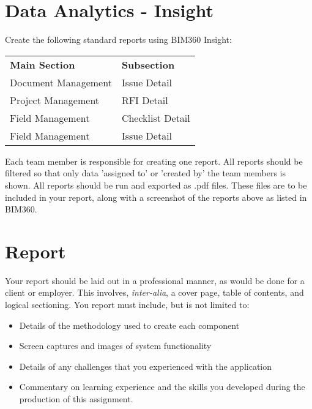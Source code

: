\section{Data Analytics - Insight}

Create the following standard reports using BIM360 Insight: 

\begin{table}[h!]
	\begin{center}
		\begin{tabular}{p{5cm}  p{5cm} }
			\toprule
			\textbf{Main Section} & \textbf{Subsection} \\ 
			\cmidrule(r){1-1}\cmidrule(lr){2-2}
			Document Management & Issue Detail \\
			Project Management & RFI Detail \\
			Field Management & Checklist Detail \\
			Field Management & Issue Detail \\
			\bottomrule
		\end{tabular}
		\label{tbl:markSchemeAsmt2}
	\end{center}
\end{table}


Each team member is responsible for creating one report.  All reports should be filtered so that only data 'assigned to' or 'created by' the team members is shown.  All reports should be run and exported as .pdf files.  These files are to be included in your report, along with a screenshot of the reports above as listed in BIM360.\\



\newpage
\section*{Report}
Your report should be laid out in a professional manner, as would be done for a client or employer.  This involves, \emph{inter-alia}, a cover page, table of contents, and logical sectioning.  You report must include, but is not limited to:
\begin{itemize}
	\item Details of the methodology used to create each component
	\item Screen captures and images of system functionality
	\item Details of any challenges that you experienced with the application
	\item Commentary on learning experience and the skills you developed during the production of this assignment.
\end{itemize}
  


